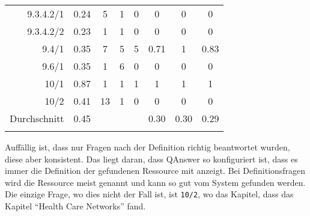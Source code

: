 \begin{longtable}{r c c c c c c c}
  9.3.4.2/1     & 0.24  & 5     & 1     & 0             & 0     & 0     & 0       \\
  9.3.4.2/2     & 0.23  & 1     & 1     & 0             & 0     & 0     & 0       \\
  9.4/1         & 0.35  & 7     & 5     & 5             & 0.71  & 1     & 0.83    \\
  9.6/1         & 0.35  & 1     & 6     & 0             & 0     & 0     & 0       \\
  10/1          & 0.87  & 1     & 1     & 1             & 1     & 1     & 1       \\
  10/2          & 0.41  & 13    & 1     & 0             & 0     & 0     & 0       \\
  \midrule
  Durchschnitt  & 0.45  &       &       &               & 0.30  & 0.30  & 0.29    \\
  \bottomrule \\
\end{longtable}

Auffällig ist, dass nur Fragen nach der Definition richtig beantwortet wurden, diese aber konsistent.
Das liegt daran, dass QAnswer so konfiguriert ist, dass es immer die Definition der gefundenen Ressource mit anzeigt.
Bei Definitionsfragen wird die Ressource meist genannt und kann so gut vom System gefunden werden.
Die einzige Frage, wo dies nicht der Fall ist, ist \texttt{10/2}, wo das Kapitel, dass das Kapitel \enquote{Health Care Networks} fand.
